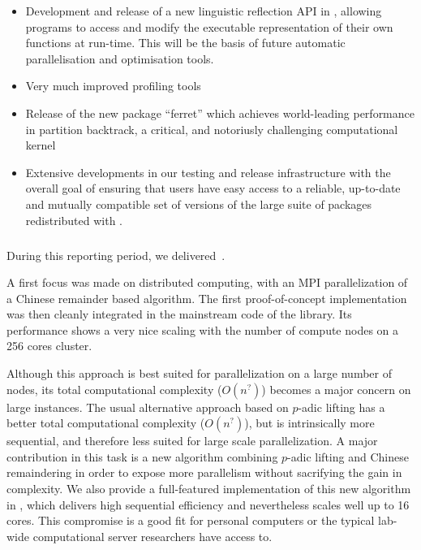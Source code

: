 \begin{itemize}
  \item Development and release of a new linguistic reflection API in \GAP, allowing \GAP programs to
    access and modify the executable representation of their own functions at run-time. This will be
    the basis of future automatic parallelisation and optimisation tools.
  \item Very much improved profiling tools
  \item Release of the new package ``ferret'' which achieves world-leading performance in partition
    backtrack, a critical, and notoriusly challenging computational kernel
  \item Extensive developments in our testing and release infrastructure with the overall goal of
    ensuring that \GAP users have easy access to a reliable, up-to-date and mutually compatible set of
    versions of the large suite of packages redistributed with \GAP.
\end{itemize}

\medskip
\subparagraph{}
  \label{hpc@hpc-linbox}

During this reporting period, we delivered~.

A first focus was made on distributed computing, with an MPI parallelization of a Chinese remainder based
algorithm. The first proof-of-concept implementation was then cleanly integrated in the mainstream code of the
library. Its performance shows a very nice scaling with the number of compute nodes on a 256 cores cluster.


Although this approach is best suited for parallelization on a large
number of nodes, its total computational complexity ($O(n^?)$) becomes
a major concern on large instances.
%
The usual alternative approach based on $p$-adic lifting has a better total computational complexity ($O(n^?)$), but is intrinsically more
sequential, and therefore less suited for large scale parallelization.
A major contribution in this task is a new algorithm combining $p$-adic lifting and Chinese remaindering in order to
expose more parallelism without sacrifying the gain in complexity.
We also provide a full-featured  implementation of this new algorithm in \Linbox, which delivers high
sequential efficiency and nevertheless scales well up to 16 cores.
This compromise is a good fit for personal computers or the typical
lab-wide computational server researchers have access to.

